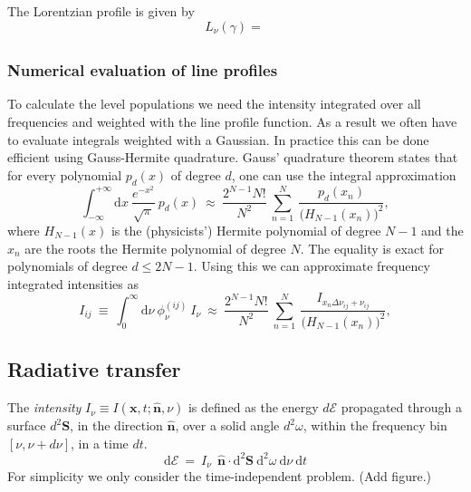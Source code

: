 \documentclass[]{article}
\newcommand{\D}{\text{d}}
\begin{document}
The Lorentzian profile is given by
\begin{equation}
L_{\nu}(\gamma) = \frac{}{}
\end{equation}

\subsubsection{Numerical evaluation of line profiles}

To calculate the level populations we need the intensity integrated over all frequencies and weighted with the line profile function. As a result we often have to evaluate integrals weighted with a Gaussian. In practice this can be done efficient using Gauss-Hermite quadrature. Gauss' quadrature theorem states that for every polynomial $p_{d}(x)$ of degree $d$, one can use the integral approximation
\begin{equation}
\int_{-\infty}^{+\infty} \D x \ \frac{e^{-x^{2}}}{\sqrt{\pi}} \ p_{d}(x) \ \approx \ \frac{2^{N-1}N!}{N^{2}} \ \sum_{n=1}^{N} \ \frac{p_{d}(x_{n})}{\big( H_{N-1}(x_{n}) \big)^{2}},
\end{equation}
where $H_{N-1}(x)$ is the (physicists') Hermite polynomial of degree $N-1$ and the $x_{n}$ are the roots  the Hermite polynomial of degree $N$. The equality is exact for polynomials of degree $d\leq2N-1$. Using this we can approximate frequency integrated intensities as
\begin{equation}
I_{ij} \ \equiv \ \int_{0}^{\infty} \D \nu \ \phi_{\nu}^{(ij)} \ I_{\nu} \ \approx \ \frac{2^{N-1}N!}{N^{2}} \ \sum_{n=1}^{N} \ \frac{ I_{ x_{n} \Delta\nu_{ij} + \nu_{ij} } }{\big( H_{N-1}(x_{n}) \big)^{2}},
\end{equation}



\subsection{Radiative transfer}

The \emph{intensity} $I_{\nu}\equiv I( \textbf{x},t;\hat{\textbf{n}},\nu)$ is defined as the energy $d\mathcal{E}$ propagated through a surface $d^{2}\textbf{S}$, in the direction $\hat{\textbf{n}}$, over a solid angle $d^{2}\omega$, within the frequency bin $[\nu,\nu+d\nu]$, in a time $dt$.
\begin{equation}
	\D \mathcal{E} \ = \ I_{\nu} \ \ \hat{\textbf{n}} \cdot \D^{2}\textbf{S} \ \D^{2}\omega \ \D\nu \ \D t
\end{equation}
For simplicity we only consider the time-independent problem. (Add figure.)
\end{document}
